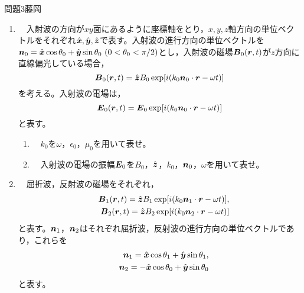 \documentclass[fleqn]{jbook}
\def\Vec#1{\mbox{\boldmath $#1$}}
\begin{document}
\begin{question}{問題3}{藤岡}
\begin{enumerate}
    \begin{enumerate}
        \item 　$(1)$式が成立することを示せ。\\
        
        \item 　誘導電荷密度$\rho$と電場$\Vec{E}$の間には関係式$\epsilon_0\Vec{\nabla}\cdot \Vec{E}=\rho$が成立する。誘電体の表面($x=+0$)における電荷の面密度$\sigma(y,z,t)$を$E_{1,x}(0,y,z,t)$，$\epsilon_0$，$\epsilon_1$を用いて表せ。\\
    \end{enumerate}
    
    \item 　入射波の方向が$xy$面にあるように座標軸をとり，$x,y,z$軸方向の単位ベクトルをそれぞれ$\hat{\Vec{x}},\hat{\Vec{y}},\hat{\Vec{z}}$で表す。入射波の進行方向の単位ベクトルを$\Vec{n}_0=\hat{\Vec{x}}\cos\theta_0+\hat{\Vec{y}}\sin\theta_0~(0<\theta_0<\pi/2)$とし，入射波の磁場$\Vec{B}_0(\Vec{r},t)$が$z$方向に直線偏光している場合，
    $$
    \Vec{B}_0(\Vec{r},t)=\hat{\Vec{z}}B_0\exp[i(k_0\Vec{n}_0\cdot\Vec{r}-\omega t)]
    $$
    を考える。入射波の電場は，
    $$
    \Vec{E}_0(\Vec{r},t)=\Vec{E}_0\exp[i(k_0\Vec{n}_0\cdot\Vec{r}-\omega t)]
    $$
    と表す。\\

    \begin{enumerate}
        \item 　$k_0$を$\omega$，$\epsilon_0$，$\mu_0$を用いて表せ。\\
        
        \item 　入射波の電場の振幅$\Vec{E}_0$を$B_0$，$\hat{\Vec{z}}$，$k_0$，$\Vec{n}_0$，$\omega$を用いて表せ。\\
        
    \end{enumerate}
    
    \item 　屈折波，反射波の磁場をそれぞれ，
    \begin{eqnarray}
    &&\Vec{B}_1(\Vec{r},t)=\hat{\Vec{z}}B_1\exp[i(k_0\Vec{n}_1\cdot\Vec{r}-\omega t)] ,\cr
    &&\Vec{B}_2(\Vec{r},t)=\hat{\Vec{z}}B_2\exp[i(k_0\Vec{n}_2\cdot\Vec{r}-\omega t)] \nonumber
    \end{eqnarray}
    と表す。$\Vec{n}_1$，$\Vec{n}_2$はそれぞれ屈折波，反射波の進行方向の単位ベクトルであり，これらを
    \begin{eqnarray}
    &&\Vec{n}_1=\hat{\Vec{x}}\cos\theta_1+\hat{\Vec{y}}\sin\theta_1 ,\cr
    &&\Vec{n}_2=-\hat{\Vec{x}}\cos\theta_0+\hat{\Vec{y}}\sin\theta_0 \nonumber
    \end{eqnarray}
    と表す。\\
    

\end{enumerate}
\end{question}
\end{document}
